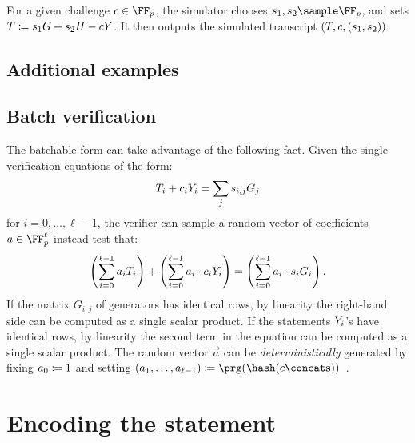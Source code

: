 \documentclass[11pt]{article}
\begin{document}
For a given challenge $c\in\FF_p$, the simulator chooses $s_1,s_2\sample\FF_p$, and sets $T\coloneqq s_1G + s_2H -cY$.
It then outputs the simulated transcript $(T,c,(s_1,s_2))$.

\subsection{Additional examples}



\subsection{Batch verification}

The batchable form can take advantage of the following fact.
Given the single verification equations of the form:
\[
   T_i + c_i Y_i = \sum_j s_{i, j} G_j
\]
for $i=0, \dots,\ell-1$,
the verifier can sample a random vector of coefficients $a \in \FF_p^\ell$ instead test that:
\[
  \left(\sum_{i=0}^{\ell-1} a_i T_i\right) + \left(\sum_{i=0}^{\ell-1} a_i \cdot  c_i Y_i \right) = \left(\sum_{i=0}^{\ell-1} a_i \cdot s_i G_i\right).
\]
If the matrix $G_{i, j}$ of generators has identical rows, by linearity the right-hand side can be computed as a single scalar product.
If the statements $Y_i$'s have identical rows, by linearity the second term in the equation can be computed as a single scalar product.
The random vector $\vec a$ can be \emph{deterministically} generated by fixing $a_0 \coloneqq 1$ and setting $(a_1, \dots, a_{\ell-1}) \defeq \prg(\hash(\challenge \concat \vec s))$~\cite{bip-schnorr}.



\section{Encoding the statement}
\end{document}
